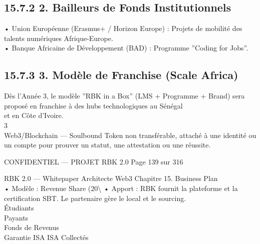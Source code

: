 \subsection{15.7.2 2. Bailleurs de Fonds Institutionnels}
• Union Européenne (Erasmus+ / Horizon Europe) : Projets de mobilité des talents numériques Afrique-Europe.\\
\vspace{0.5em}
• Banque Africaine de Développement (BAD) : Programme ”Coding for Jobs”.\\
\vspace{0.5em}
\vspace{0.5em}
\subsection{15.7.3 3. Modèle de Franchise (Scale Africa)}
Dès l’Année 3, le modèle ”RBK in a Box” (LMS + Programme + Brand) sera proposé en franchise à des hubs technologiques au Sénégal\\
et en Côte d’Ivoire.\\
3\\
Web3/Blockchain — Soulbound Token non transférable, attaché à une identité ou un compte pour prouver un statut, une attestation ou une réussite.\\
\vspace{0.5em}
\vspace{0.5em}
\begin{confidential}CONFIDENTIEL — PROJET RBK 2.0                                           Page 139 sur 316\end{confidential}
RBK 2.0 — Whitepaper Architecte Web3                                                                           Chapitre 15. Business Plan\\
\vspace{0.5em}
\vspace{0.5em}
• Modèle : Revenue Share (20\textbackslash{}%
\vspace{0.5em}
• Apport : RBK fournit la plateforme et la certification SBT. Le partenaire gère le local et le sourcing.\\
\vspace{0.5em}
\vspace{0.5em}
Étudiants\\
Payants\\
\vspace{0.5em}
Fonds de                    Revenus\\
Garantie ISA               ISA Collectés\\
